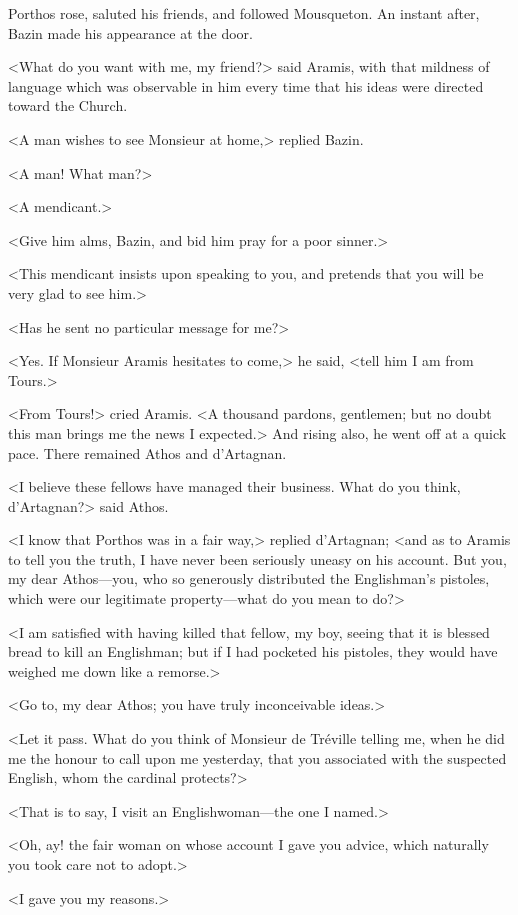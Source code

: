 Porthos rose, saluted his friends, and followed Mousqueton. An instant after, Bazin made his appearance at the door. 

<What do you want with me, my friend?> said Aramis, with that mildness of language which was observable in him every time that his ideas were directed toward the Church. 

<A man wishes to see Monsieur at home,> replied Bazin. 

<A man! What man?> 

<A mendicant.> 

<Give him alms, Bazin, and bid him pray for a poor sinner.> 

<This mendicant insists upon speaking to you, and pretends that you will be very glad to see him.> 

<Has he sent no particular message for me?> 

<Yes. If Monsieur Aramis hesitates to come,> he said, <tell him I am from Tours.> 

<From Tours!> cried Aramis. <A thousand pardons, gentlemen; but no doubt this man brings me the news I expected.> And rising also, he went off at a quick pace. There remained Athos and d'Artagnan. 

<I believe these fellows have managed their business. What do you think, d'Artagnan?> said Athos. 

<I know that Porthos was in a fair way,> replied d'Artagnan; <and as to Aramis to tell you the truth, I have never been seriously uneasy on his account. But you, my dear Athos---you, who so generously distributed the Englishman's pistoles, which were our legitimate property---what do you mean to do?> 

<I am satisfied with having killed that fellow, my boy, seeing that it is blessed bread to kill an Englishman; but if I had pocketed his pistoles, they would have weighed me down like a remorse.> 

<Go to, my dear Athos; you have truly inconceivable ideas.> 

<Let it pass. What do you think of Monsieur de Tréville telling me, when he did me the honour to call upon me yesterday, that you associated with the suspected English, whom the cardinal protects?> 

<That is to say, I visit an Englishwoman---the one I named.> 

<Oh, ay! the fair woman on whose account I gave you advice, which naturally you took care not to adopt.> 

<I gave you my reasons.> 

